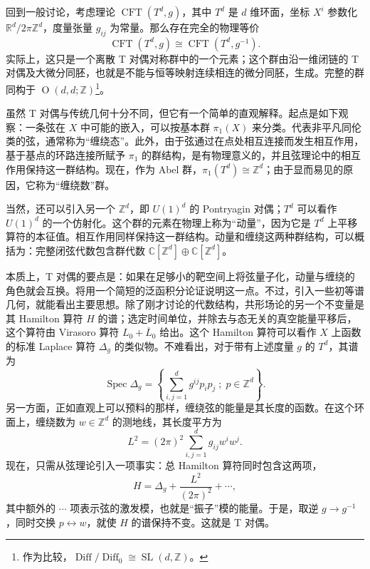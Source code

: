 回到一般讨论，考虑理论 $\operatorname{CFT}(T^d,g)$，其中 $T^d$ 是 $d$ 维环面，坐标 $X^i$ 参数化 $\mathbb{R}^d/2\pi\mathbb{Z}^d$，度量张量 $g_{ij}$ 为常量。那么存在完全的物理等价
\begin{equation}\label{eq:1.5}
\operatorname{CFT}(T^d,g)\cong\operatorname{CFT}(T^d,g^{-1}).
\end{equation}
实际上，这只是一个离散 T 对偶对称群中的一个元素；这个群由沿一维闭链的 T 对偶及大微分同胚，也就是不能与恒等映射连续相连的微分同胚，生成。完整的群同构于 $\operatorname{O}(d,d;\mathbb{Z})$\footnote{作为比较，$\operatorname{Diff}/\operatorname{Diff}_0\cong\operatorname{SL}(d,\mathbb{Z})$。}。

虽然 T 对偶与传统几何十分不同，但它有一个简单的直观解释。起点是如下观察：一条弦在 $X$ 中可能的嵌入，可以按基本群 $\pi_1(X)$ 来分类。代表非平凡同伦类的弦，通常称为“缠绕态”。此外，由于弦通过在点处相互连接而发生相互作用，基于基点的环路连接所赋予 $\pi_1$ 的群结构，是有物理意义的，并且弦理论中的相互作用保持这一群结构。现在，作为 Abel 群，$\pi_1(T^d)\cong\mathbb{Z}^d$；由于显而易见的原因，它称为“缠绕数”群。

当然，还可以引入另一个 $\mathbb{Z}^d$，即 $U(1)^d$ 的 Pontryagin 对偶；$T^d$ 可以看作 $U(1)^d$ 的一个仿射化。这个群的元素在物理上称为“动量”，因为它是 $T^d$ 上平移算符的本征值。相互作用同样保持这一群结构。动量和缠绕这两种群结构，可以概括为：完整闭弦代数包含群代数 $\mathbb{C}[\mathbb{Z}^d]\oplus\mathbb{C}[\mathbb{Z}^d]$。

本质上，T 对偶的要点是：如果在足够小的靶空间上将弦量子化，动量与缠绕的角色就会互换。将用一个简短的泛函积分论证说明这一点。不过，引入一些初等谱几何，就能看出主要思想。除了刚才讨论的代数结构，共形场论的另一个不变量是其 Hamilton 算符 $H$ 的谱；选定时间单位，并除去与态无关的真空能量平移后，这个算符由 Virasoro 算符 $L_0+\overline{L}_0$ 给出。这个 Hamilton 算符可以看作 $X$ 上函数的标准 Laplace 算符 $\Delta_g$ 的类似物。不难看出，对于带有上述度量 $g$ 的 $T^d$，其谱为
\begin{equation}\label{eq:1.6}
\operatorname{Spec}\Delta_g=\left\{\sum_{i,j=1}^d g^{ij}p_i p_j\;;\;p\in\mathbb{Z}^d\right\}.
\end{equation}
另一方面，正如直观上可以预料的那样，缠绕弦的能量是其长度的函数。在这个环面上，缠绕数为 $w\in\mathbb{Z}^d$ 的测地线，其长度平方为
\begin{equation}\label{eq:1.7}
L^2=(2\pi)^2\sum_{i,j=1}^d g_{ij}w^iw^j.
\end{equation}
现在，只需从弦理论引入一项事实：总 Hamilton 算符同时包含这两项，
\[
H=\Delta_g+\frac{L^2}{(2\pi)^2}+\cdots,
\]
其中额外的 $\cdots$ 项表示弦的激发模，也就是“振子”模的能量。于是，取逆 $g\to g^{-1}$，同时交换 $p\leftrightarrow w$，就使 $H$ 的谱保持不变。这就是 T 对偶。

